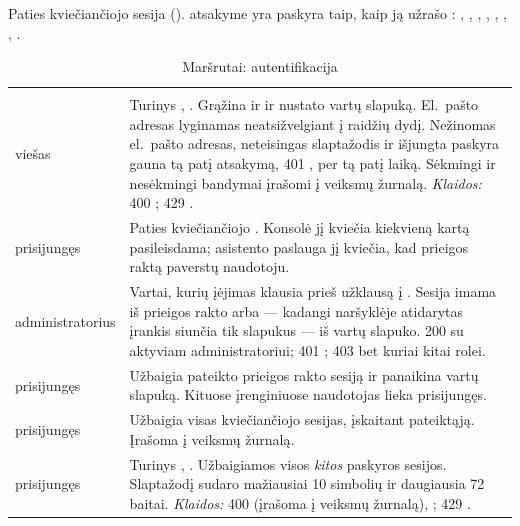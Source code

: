 Paties kviečiančiojo sesija ().  atsakyme yra paskyra
taip, kaip ją užrašo : , , ,
, , , , .

\begin{xltabular}{\textwidth}{@{}L{19mm}Y@{}}
\caption{Maršrutai: autentifikacija}\label{tab:api:auth}\\
\toprule {} &  \\ \midrule \endfirsthead
\toprule {} &  \\ \midrule \endhead
\bottomrule \endlastfoot
{}
viešas & Turinys , . Grąžina  ir  ir nustato
  vartų slapuką. El.~pašto adresas lyginamas neatsižvelgiant į raidžių dydį. Nežinomas el.~pašto
  adresas, neteisingas slaptažodis ir išjungta paskyra gauna tą patį atsakymą, 401
  , per tą patį laiką. Sėkmingi ir nesėkmingi bandymai įrašomi į veiksmų
  žurnalą. \emph{Klaidos:} 400 ; 429 . \\
\addlinespace
{}
prisijungęs & Paties kviečiančiojo . Konsolė jį kviečia kiekvieną kartą pasileisdama;
  asistento paslauga jį kviečia, kad prieigos raktą paverstų naudotoju. \\
\addlinespace
{}
administratorius & Vartai, kurių įėjimas klausia prieš užklausą į . Sesija imama
  iš prieigos rakto arba --- kadangi naršyklėje atidarytas įrankis siunčia tik slapukus --- iš
  vartų slapuko. 200 su  aktyviam administratoriui; 401 ; 403
   bet kuriai kitai rolei. \\
\addlinespace
{}
prisijungęs & Užbaigia pateikto prieigos rakto sesiją ir panaikina vartų slapuką. Kituose
  įrenginiuose naudotojas lieka prisijungęs. \\
\addlinespace
{}
prisijungęs & Užbaigia visas kviečiančiojo sesijas, įskaitant pateiktąją. Įrašoma į veiksmų
  žurnalą. \\
\addlinespace
{}
prisijungęs & Turinys , . Užbaigiamos visos \emph{kitos}
  paskyros sesijos. Slaptažodį sudaro mažiausiai 10 simbolių ir daugiausia 72 baitai.
  \emph{Klaidos:} 400  (įrašoma į veiksmų žurnalą), ; 429
  . \\
\end{xltabular}

